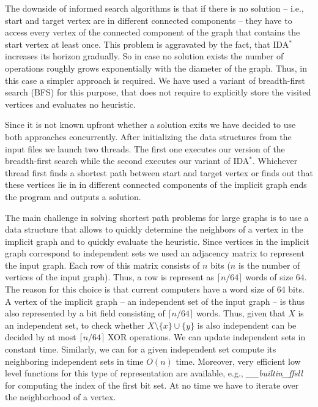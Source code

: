 \documentclass{article}
\begin{document}
The downside of informed search algorithms is that if there is no
solution -- i.e., start and target vertex are in different connected
components -- they have to access every vertex of the connected
component of the graph that contains the start vertex at least once.
This problem is aggravated by the fact, that IDA$^\ast$ increases its
horizon gradually. So in case no solution exists the number of
operations roughly grows exponentially with the diameter of the graph.
Thus, in this case a simpler approach is required. We have used a
variant of breadth-first search (BFS) for this purpose, that does not
require to explicitly store the visited vertices and evaluates no
heuristic.

Since it is not known upfront whether a solution exits we have decided
to use both approaches concurrently. After initializing the data
structures from the input files we launch two threads. The first one
executes our version of the breadth-first search while the second
executes our variant of IDA$^\ast$. Whichever thread first finds a
shortest path between start and target vertex or finds out that these
vertices lie in in different connected components of the implicit
graph ends the program and outputs a solution.

The main challenge in solving shortest path problems for large graphs
is to use a data structure that allows to quickly determine the
neighbors of a vertex in the implicit graph and to quickly evaluate
the heuristic. Since vertices in the implicit graph correspond to
independent sets we used an adjacency matrix to represent the input
graph. Each row of this matrix consists of $n$ bits ($n$ is the number
of vertices of the input graph). Thus, a row is represent as
$\lceil n/64\rceil$ words of size $64$. The reason for this choice is
that current computers have a word size of 64 bits. A vertex of the
implicit graph -- an independent set of the input graph -- is thus
also represented by a bit field consisting of $\lceil n/64\rceil$
words. Thus, given that $X$ is an independent set, to check whether
$X\setminus \{x\} \cup \{y\}$ is also independent can be decided by at
most $\lceil n/64\rceil$ XOR operations. We can update independent
sets in constant time. Similarly, we can for a given independent set
compute its neighboring independent sets in time $O(n)$ time.
Moreover, very efficient low level functions for this type of
representation are available, e.g.,  {\em \_\_builtin\_ffsll} for
computing the index of the first bit set. At no time we have to
iterate over the neighborhood of a vertex.
\end{document}

